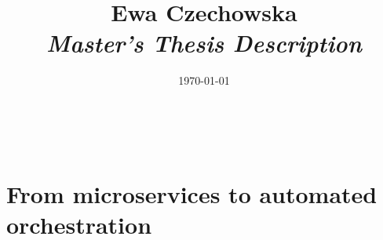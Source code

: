 \documentclass[12pt]{article}
\title{
{\small Ewa Czechowska } \\
\bf\textit{ Master’s Thesis Description } \\
\vspace{4cm}}
\date{\today}
\begin{document}
\maketitle
~\vspace{8cm}
\newpage

\tableofcontents
\newpage


\newpage

\section{From microservices to automated orchestration}


\newpage

\printbibliography
\end{document}
